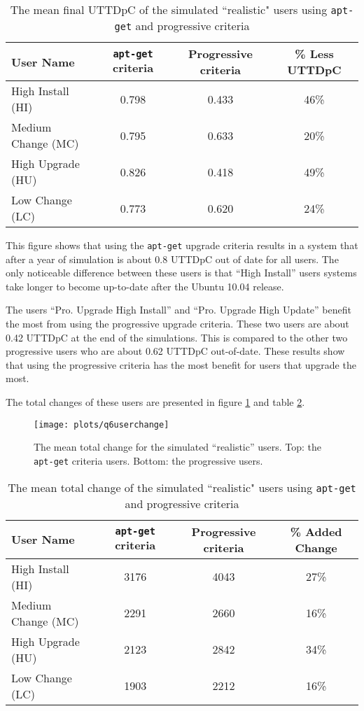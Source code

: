 \begin{table}[h!]
\centering
\begin{tabular}{|l | c | c | c | }
\hline
User Name 				& \texttt{apt-get} criteria & Progressive criteria 	& \% Less UTTDpC	\\ \hline
High Install (HI)			& 0.798				& 0.433 			& 46\%	\\
Medium Change (MC)			& 0.795				& 0.633 			& 20\% 	\\
High Upgrade (HU)			& 0.826				& 0.418				& 49\%  \\
Low Change 	(LC)			& 0.773				& 0.620 			& 24\%   \\ \hline
\end{tabular}
\caption{The mean final UTTDpC of the simulated ``realistic" users using \texttt{apt-get} and progressive criteria}
\label{exp.tblq6uttd}
\end{table}

This figure shows that using the \texttt{apt-get} upgrade criteria results in a system that after a year of simulation is about 0.8 UTTDpC out of date for all users. 
The only noticeable difference between these users is that ``High Install'' users systems take longer to become up-to-date after the Ubuntu 10.04 release.


The users ``Pro. Upgrade High Install'' and ``Pro. Upgrade High Update'' benefit the most from using the progressive upgrade criteria.
These two users are about 0.42 UTTDpC at the end of the simulations.
This is compared to the other two progressive users who are about 0.62 UTTDpC out-of-date.
These results show that using the progressive criteria has the most benefit for users that upgrade the most.      

The total changes of these users are presented in figure \ref{exp.q6userchange} and table \ref{exp.tblq6change}.
\begin{figure}[htp]
\begin{center}
  \texttt{[image: plots/q6userchange]}
  \caption{The mean total change for the simulated ``realistic'' users.  Top: the \texttt{apt-get} criteria users. Bottom: the progressive users.}
  \label{exp.q6userchange}
\end{center}
\end{figure}

\begin{table}[h!]
\centering
\begin{tabular}{|l | c | c | c | }
\hline
User Name 				& \texttt{apt-get} criteria 		& Progressive criteria 	& \% Added Change	\\ \hline
High Install (HI)			& 3176			& 4043 	& 27\% 	\\
Medium Change (MC)			& 2291			& 2660 	& 16\% 	\\
High Upgrade (HU)			& 2123			& 2842	& 34\%   \\
Low Change 	(LC)			& 1903			& 2212 	& 16\%   \\ \hline
\end{tabular}
\caption{The mean total change of the simulated ``realistic" users using \texttt{apt-get} and progressive criteria}
\label{exp.tblq6change}
\end{table}


